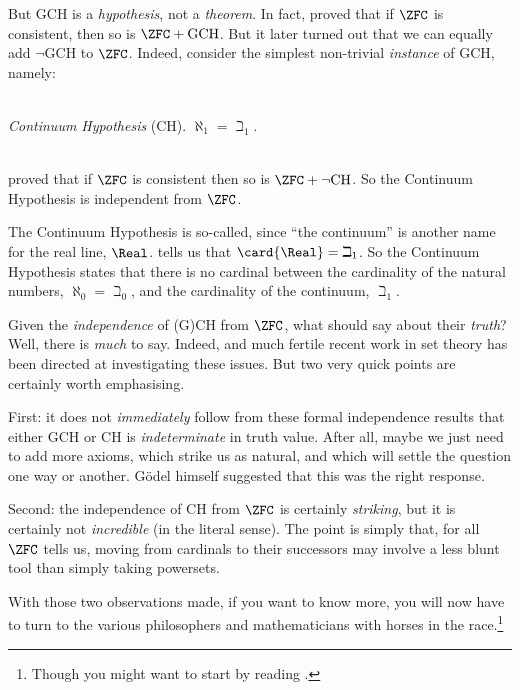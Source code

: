 \documentclass[../../../include/open-logic-section]{subfiles}
\begin{document}
But GCH is a \emph{hypothesis}, not a \emph{theorem}. In fact,
\citet{Godel1938} proved that if $\ZFC$ is consistent, then so is
$\ZFC + \text{GCH}$. But it later turned out that we can equally add
$\lnot$GCH to $\ZFC$. Indeed, consider the simplest non-trivial
\emph{instance} of GCH, namely: 

\
\\\emph{Continuum Hypothesis} (CH). $\aleph_1 = \beth_1$. 

\
\\
\citet{Cohen1963} proved that if $\ZFC$ is consistent then so is $\ZFC
+ \lnot\text{CH}$. So the Continuum Hypothesis is independent from $\ZFC$.

The Continuum Hypothesis is so-called, since ``the continuum'' is
another name for the real line, $\Real$.
\olref[opps]{continuumis2aleph0} tells us that $\card{\Real} =
\beth_1$. So the Continuum Hypothesis states that there is no cardinal
between the cardinality of the natural numbers, $\aleph_0 = \beth_0$,
and the cardinality of the continuum, $\beth_1$.

Given the \emph{independence} of (G)CH from $\ZFC$, what should say
about their \emph{truth}? Well, there is \emph{much} to say. Indeed,
and much fertile recent work in set theory has been directed at
investigating these issues. But two very quick points are certainly worth
emphasising. 

First: it does not \emph{immediately} follow from these formal
independence results that either GCH or CH is \emph{indeterminate} in
truth value. After all, maybe we just need to add more axioms, which
strike us as natural, and which will settle the question one way or
another. G\"odel himself suggested that this was the right response. 

Second: the independence of CH from $\ZFC$ is certainly
\emph{striking}, but it is certainly not \emph{incredible} (in the
literal sense). The point is simply that, for all $\ZFC$ tells us,
moving from cardinals to their successors may involve a less blunt
tool than simply taking powersets.

With those two observations made, if you want to know more, you will
now have to turn to the various philosophers and mathematicians with
horses in the race.\footnote{Though you might want to start by reading \citet[\S15.6]{Potter2004}.}
\end{document}
